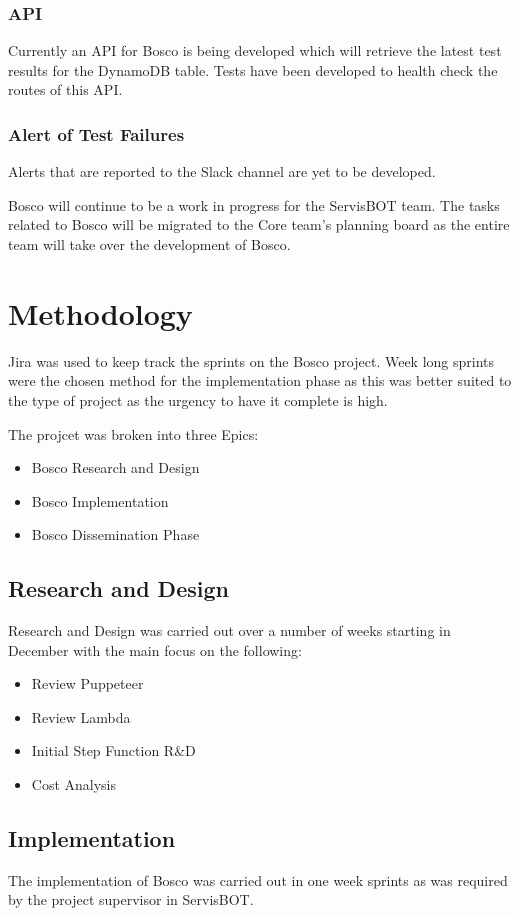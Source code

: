 \documentclass[12pt,a4paper,titlepage]{report}
\begin{document}
\subsection{API}
Currently an API for Bosco is being developed which will retrieve the latest test results for the DynamoDB table. 
Tests have been developed to health check the routes of this API.

\subsection{Alert of Test Failures}
Alerts that are reported to the Slack channel are yet to be developed.

Bosco will continue to be a work in progress for the ServisBOT team. 
The tasks related to Bosco will be migrated to the Core team's planning board as the entire team will take over the development of Bosco. 

\appendix
\chapter{Methodology}
Jira was used to keep track the sprints on the Bosco project. Week long sprints were the chosen method for the implementation phase as this
was better suited to the type of project as the urgency to have it complete is high.

The projcet was broken into three Epics:

\begin{itemize}
  \item Bosco Research and Design
  \item Bosco Implementation
  \item Bosco Dissemination Phase
\end{itemize}
\section{Research and Design}
Research and Design was carried out over a number of weeks starting in December with the main focus on the following:
\begin{itemize}
\item Review Puppeteer
\item Review Lambda
\item Initial Step Function R\&D
\item Cost Analysis
\end{itemize}

\section{Implementation}
The implementation of Bosco was carried out in one week sprints as was required by the project supervisor in ServisBOT\@. 
\end{document}
